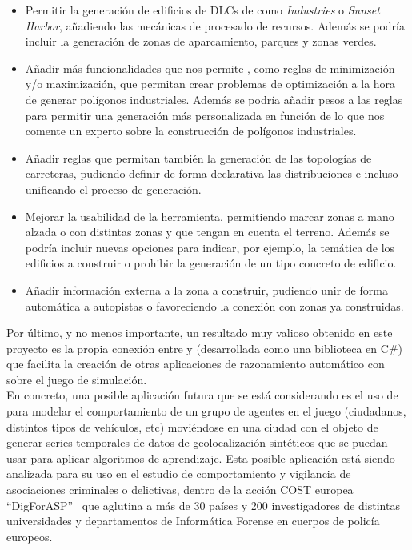 \begin{itemize}
	\item Permitir la generación de edificios de DLCs de \cities como \textit{Industries} o \textit{Sunset Harbor}, añadiendo las mecánicas de procesado de recursos. Además se podría incluir la generación de zonas de aparcamiento, parques y zonas verdes.
	\item Añadir más funcionalidades que nos permite \clingo, como reglas de minimización y/o maximización, que permitan crear problemas de optimización a la hora de generar polígonos industriales. Además se podría añadir pesos a las reglas para permitir una generación más personalizada en función de lo que nos comente un experto sobre la construcción de polígonos industriales.
	\item Añadir reglas que permitan también la generación de las topologías de carreteras, pudiendo definir de forma declarativa las distribuciones e incluso unificando el proceso de generación.
	\item Mejorar la usabilidad de la herramienta, permitiendo marcar zonas a mano alzada o con distintas zonas y que tengan en cuenta el terreno. Además se podría incluir nuevas opciones para indicar, por ejemplo, la temática de los edificios a construir o prohibir la generación de un tipo concreto de edificio.
	\item Añadir información externa a la zona a construir, pudiendo unir de forma automática a autopistas o favoreciendo la conexión con zonas ya construidas.
\end{itemize}

Por último, y no menos importante, un resultado muy valioso obtenido en este proyecto es la propia conexión entre \cities y \clingo (desarrollada como una biblioteca en C\#) que facilita la creación de otras aplicaciones de razonamiento automático con \asp sobre el juego de simulación. \\

En concreto, una posible aplicación futura que se está considerando es el uso de \asp para modelar el comportamiento de un grupo de agentes en el juego (ciudadanos, distintos tipos de vehículos, etc) moviéndose en una ciudad con el objeto de generar series temporales de datos de geolocalización sintéticos que se puedan usar para aplicar algoritmos de aprendizaje. Esta posible aplicación está siendo analizada para su uso en el estudio de comportamiento y vigilancia de asociaciones criminales o delictivas, dentro de la acción COST europea ``DigForASP''~\cite{digforasp} que aglutina a más de 30 países y 200 investigadores de distintas universidades y departamentos de Informática Forense en cuerpos de policía europeos.